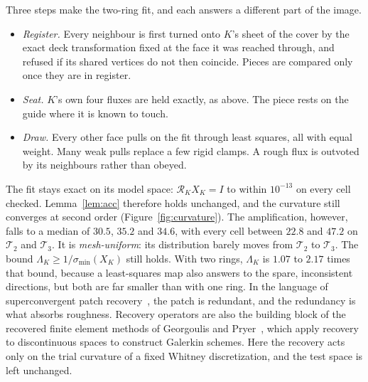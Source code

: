\documentclass[11pt]{article}
\theoremstyle{definition}
\theoremstyle{remark}
\newcommand{\T}{\mathcal{T}}
\newcommand{\cR}{\mathcal{R}}
\begin{document}
Three steps make the two-ring fit, and each answers a different part of the image.
\begin{itemize}
  \item \emph{Register.} Every neighbour is first turned onto $K$'s sheet of the cover by
    the exact deck transformation fixed at the face it was reached through, and refused if
    its shared vertices do not then coincide. Pieces are compared only once they are in
    register.
  \item \emph{Seat.} $K$'s own four fluxes are held exactly, as above. The piece rests on
    the guide where it is known to touch.
  \item \emph{Draw.} Every other face pulls on the fit through least squares, all with
    equal weight. Many weak pulls replace a few rigid clamps. A rough flux is outvoted by
    its neighbours rather than obeyed.
\end{itemize}

The fit stays exact on its model space: $\cR_K X_K = I$ to within $10^{-13}$ on every cell
checked. Lemma~\ref{lem:acc} therefore holds unchanged, and the curvature still converges
at second order (Figure~\ref{fig:curvature}). The amplification, however, falls to a
median of $30.5$, $35.2$ and $34.6$, with every cell between
$22.8$ and $47.2$ on $\T_2$ and $\T_3$. It
is \emph{mesh-uniform}: its distribution barely moves from $\T_2$ to $\T_3$. The bound
$\Lambda_K \ge 1/\sigma_{\min}(X_K)$ still holds. With two rings, $\Lambda_K$ is
$1.07$ to $2.17$ times that bound, because a least-squares map
also answers to the spare, inconsistent directions, but both are far smaller than with
one ring. In the language of superconvergent patch recovery~\cite{zz1992}, the patch is
redundant, and the redundancy is what absorbs roughness. Recovery operators are also the
building block of the recovered finite element methods of Georgoulis and
Pryer~\cite{gp2018}, which apply recovery to discontinuous spaces to construct Galerkin
schemes. Here the recovery acts only on the trial curvature of a fixed Whitney
discretization, and the test space is left unchanged.
\end{document}
